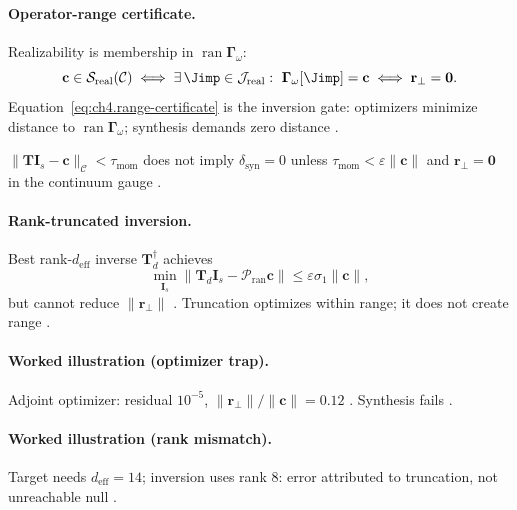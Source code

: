 
\paragraph{Operator-range certificate.}
Realizability is membership in \(\operatorname{ran}\boldsymbol{\Gamma}_\omega\):
\begin{equation}
\label{eq:ch4.range-certificate}
\mathbf{c}\in\mathcal{S}_{\mathrm{real}}(\mathcal{C})
\iff
\exists\,\Jimp\in\mathcal{J}_{\mathrm{real}}:\ \boldsymbol{\Gamma}_\omega[\Jimp]=\mathbf{c}
\iff
\mathbf{r}_{\perp}=\mathbf{0}.
\end{equation}
Equation~\eqref{eq:ch4.range-certificate} is the inversion gate: optimizers minimize distance to \(\operatorname{ran}\boldsymbol{\Gamma}_\omega\);
synthesis demands zero distance \cite{stratton1941,harrington2001,devaney2004,hansen1988}.

\begin{theorem}
\label{thm:ch4.discrete-continuum-gap}
\(\|\mathbf{T}\mathbf{I}_{s}-\mathbf{c}\|_{\mathcal{C}}<\tau_{\mathrm{mom}}\) does not imply \(\delta_{\mathrm{syn}}=0\) unless
\(\tau_{\mathrm{mom}}<\varepsilon\|\mathbf{c}\|\) and \(\mathbf{r}_{\perp}=\mathbf{0}\) in the continuum gauge \cite{harrington2001,devaney2004,stratton1941}.
\end{theorem}

\paragraph{Rank-truncated inversion.}
Best rank-\(d_{\mathrm{eff}}\) inverse \(\mathbf{T}^{\dagger}_{d}\) achieves
\begin{equation}
\label{eq:ch4.rank-truncated-inverse}
\min_{\mathbf{I}_{s}}\|\mathbf{T}_{d}\mathbf{I}_{s}-\mathcal{P}_{\mathrm{ran}}\mathbf{c}\|
\le
\varepsilon\sigma_{1}\|\mathbf{c}\|,
\end{equation}
but cannot reduce \(\|\mathbf{r}_{\perp}\|\) \cite{harrington2001,hansen1988,stratton1941}. Truncation optimizes within range; it does not create range
\cite{devaney2004}.

\paragraph{Worked illustration (optimizer trap).}
Adjoint optimizer: residual \(10^{-5}\), \(\|\mathbf{r}_{\perp}\|/\|\mathbf{c}\|=0.12\) \cite{harrington2001,devaney2004}. Synthesis fails
\cite{stratton1941,hansen1988}.

\paragraph{Worked illustration (rank mismatch).}
Target needs \(d_{\mathrm{eff}}=14\); inversion uses rank \(8\): error attributed to truncation, not unreachable null \cite{hansen1988,harrington2001}.

